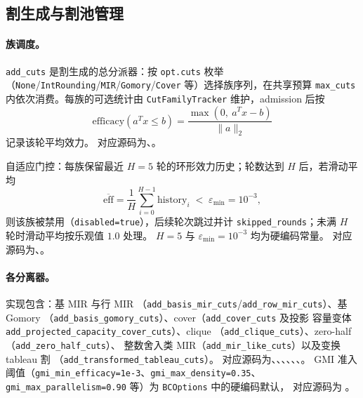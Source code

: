 \subsection{割生成与割池管理}\label{subsec:milpbc-cuts}

\paragraph{族调度。}
\texttt{add\_cuts} 是割生成的总分派器：按 \texttt{opt.cuts} 枚举
（\texttt{None}/\texttt{IntRounding}/\texttt{MIR}/\texttt{Gomory}/\texttt{Cover}
等）选择族序列，在共享预算 \texttt{max\_cuts} 内依次消费。每族的可选统计由
\texttt{CutFamilyTracker} 维护，admission 后按
\begin{equation}
  \mathrm{efficacy}(a^Tx\le b)=\frac{\max(0,\ a^Tx-b)}{\|a\|_2}
\end{equation}
记录该轮平均效力。
对应源码为、。

自适应门控：每族保留最近 $H=5$ 轮的环形效力历史；轮数达到 $H$ 后，若滑动平均
\begin{equation}
  \overline{\mathrm{eff}}=\frac{1}{H}\textstyle\sum_{i=0}^{H-1}\mathrm{history}_i
  \;<\; \varepsilon_{\min}=10^{-3},
\end{equation}
则该族被禁用（\texttt{disabled=true}），后续轮次跳过并计
\texttt{skipped\_rounds}；未满 $H$ 轮时滑动平均按乐观值 $1.0$ 处理。
$H=5$ 与 $\varepsilon_{\min}=10^{-3}$ 均为硬编码常量。
对应源码为、。

\paragraph{各分离器。}
实现包含：基 MIR 与行 MIR
（\texttt{add\_basis\_mir\_cuts}/\texttt{add\_row\_mir\_cuts}）、基 Gomory
（\texttt{add\_basis\_gomory\_cuts}）、cover（\texttt{add\_cover\_cuts} 及投影
容量变体 \texttt{add\_projected\_capacity\_cover\_cuts}）、clique
（\texttt{add\_clique\_cuts}）、zero-half（\texttt{add\_zero\_half\_cuts}）、
整数舍入类 MIR（\texttt{add\_mir\_like\_cuts}）以及变换 tableau 割
（\texttt{add\_transformed\_tableau\_cuts}）。
对应源码为、、、、、、。
GMI 准入阈值（\texttt{gmi\_min\_efficacy=1e-3}、\texttt{gmi\_max\_density=0.35}、
\texttt{gmi\_max\_parallelism=0.90} 等）为 \texttt{BCOptions} 中的硬编码默认，
对应源码为 。

